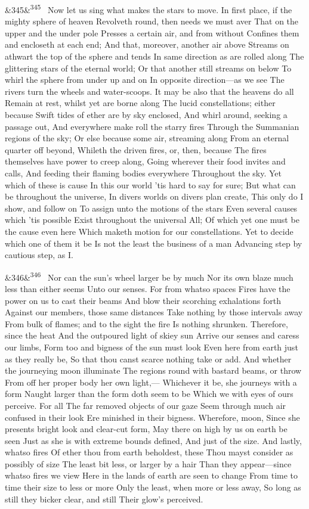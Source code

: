 \documentclass[12pt]{article}
\newcommand{\para}[1][]{\par\noindent\ifx&#1&\else\textsuperscript{\footnotesize #1}~\fi}
\begin{document}
\para[345] Now let us sing what makes the stars to move. In first place, if the mighty sphere of heaven Revolveth round, then needs we must aver That on the upper and the under pole Presses a certain air, and from without Confines them and encloseth at each end; And that, moreover, another air above Streams on athwart the top of the sphere and tends In same direction as are rolled along The glittering stars of the eternal world; Or that another still streams on below To whirl the sphere from under up and on In opposite direction---as we see The rivers turn the wheels and water-scoops. It may be also that the heavens do all Remain at rest, whilst yet are borne along The lucid constellations; either because Swift tides of ether are by sky enclosed, And whirl around, seeking a passage out, And everywhere make roll the starry fires Through the Summanian regions of the sky; Or else because some air, streaming along From an eternal quarter off beyond, Whileth the driven fires, or, then, because The fires themselves have power to creep along, Going wherever their food invites and calls, And feeding their flaming bodies everywhere Throughout the sky. Yet which of these is cause In this our world 'tis hard to say for sure; But what can be throughout the universe, In divers worlds on divers plan create, This only do I show, and follow on To assign unto the motions of the stars Even several causes which 'tis possible Exist throughout the universal All; Of which yet one must be the cause even here Which maketh motion for our constellations. Yet to decide which one of them it be Is not the least the business of a man Advancing step by cautious step, as I.

\para[346] Nor can the sun's wheel larger be by much Nor its own blaze much less than either seems Unto our senses. For from whatso spaces Fires have the power on us to cast their beams And blow their scorching exhalations forth Against our members, those same distances Take nothing by those intervals away From bulk of flames; and to the sight the fire Is nothing shrunken. Therefore, since the heat And the outpoured light of skiey sun Arrive our senses and caress our limbs, Form too and bigness of the sun must look Even here from earth just as they really be, So that thou canst scarce nothing take or add. And whether the journeying moon illuminate The regions round with bastard beams, or throw From off her proper body her own light,--- Whichever it be, she journeys with a form Naught larger than the form doth seem to be Which we with eyes of ours perceive. For all The far removed objects of our gaze Seem through much air confused in their look Ere minished in their bigness. Wherefore, moon, Since she presents bright look and clear-cut form, May there on high by us on earth be seen Just as she is with extreme bounds defined, And just of the size. And lastly, whatso fires Of ether thou from earth beholdest, these Thou mayst consider as possibly of size The least bit less, or larger by a hair Than they appear---since whatso fires we view Here in the lands of earth are seen to change From time to time their size to less or more Only the least, when more or less away, So long as still they bicker clear, and still Their glow's perceived.
\end{document}
